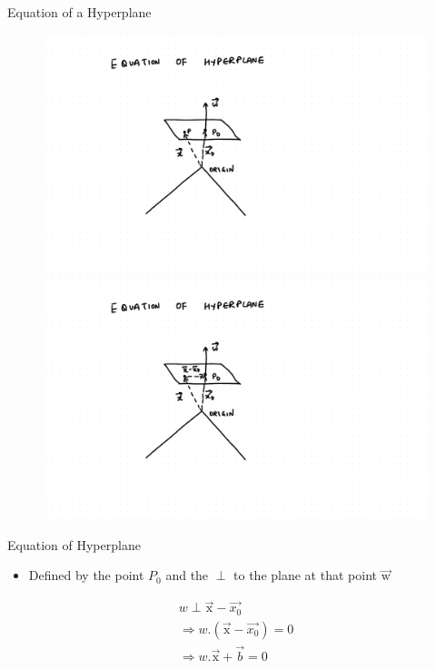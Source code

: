 \documentclass{beamer}
\begin{document}
\begin{frame}{Equation of a Hyperplane}
\begin{figure}
\begin{overprint}
 \includegraphics[scale=0.5]{./SVM/Svm-15.pdf}
 \includegraphics[scale=0.5]{./SVM/Svm-16.pdf}
\end{overprint}
\end{figure}


\end{frame}

\begin{frame}{Equation of Hyperplane}
\begin{itemize}
	\item Defined by the point $P_{0}$ and the $\perp$ to the plane at that point $\overrightarrow{\text{w}}$
\end{itemize}
\begin{align*}
  w \perp \overrightarrow{\text{x}} - \overrightarrow{x_{0}}\\
 \Rightarrow w.(\overrightarrow{\text{x}} - \overrightarrow{x_{0}}) = 0\\
 \Rightarrow w.\overrightarrow{\text{x}} +  \overrightarrow{b} = 0
\end{align*}       
        
\end{frame}
\end{document}
